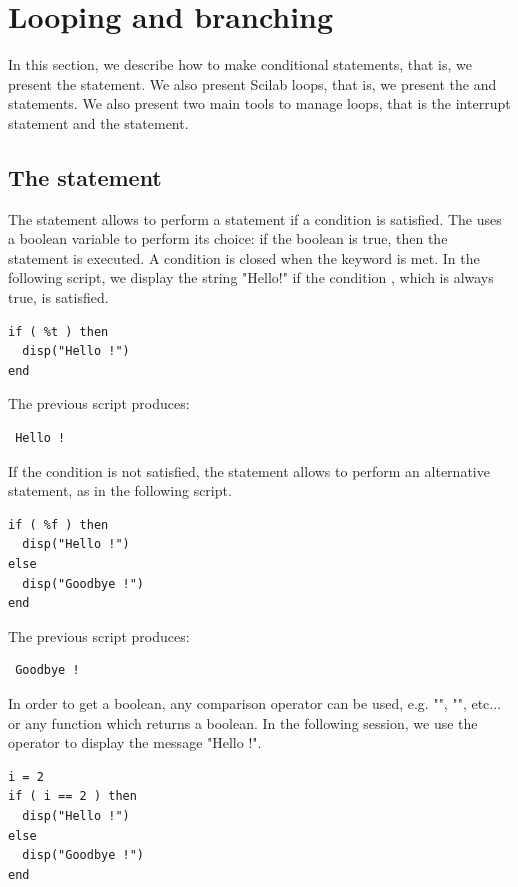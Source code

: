 \section{Looping and branching}

In this section, we describe how to make conditional statements, that is, we 
present the  statement.
We also present Scilab loops, that is, we present the 
 and  statements. 
We also present two main tools to manage loops, that is the 
interrupt statement  and the 
statement.

\subsection{The  statement}

The  statement allows to perform a statement
if a condition is satisfied. The  uses a 
boolean variable to perform its choice: if the boolean is true,
then the statement is executed. A condition is closed when the 
 keyword is met. In the following script, we 
display the string "Hello!" if the condition , which 
is always true, is satisfied.

\lstset{language=scilabscript}
\begin{lstlisting}
if ( %t ) then 
  disp("Hello !")
end
\end{lstlisting}

The previous script produces:
\lstset{language=scilabscript}
\begin{lstlisting}
 Hello !   
\end{lstlisting}

If the condition is not satisfied, the  statement
allows to perform an alternative statement, as in the following script.
\lstset{language=scilabscript}
\begin{lstlisting}
if ( %f ) then 
  disp("Hello !")
else
  disp("Goodbye !")
end
\end{lstlisting}

The previous script produces:
\lstset{language=scilabscript}
\begin{lstlisting}
 Goodbye !   
\end{lstlisting}

In order to get a boolean, any comparison operator can be used,
e.g. "\scivar{==}", "\scivar{>}", etc... or any function which returns a 
boolean.
In the following session, we use the \scivar{==} operator to 
display the message "Hello !".
\lstset{language=scilabscript}
\begin{lstlisting}
i = 2
if ( i == 2 ) then 
  disp("Hello !")
else
  disp("Goodbye !")
end
\end{lstlisting}

